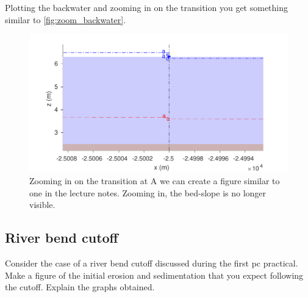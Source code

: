\documentclass[a4paper]{article}
\begin{document}
\begin{solution}
  Plotting the backwater and zooming in on the transition you get something similar to \autoref{fig:zoom_backwater}.
  \begin{figure}
      \centering
  \includegraphics[width=\linewidth]{matlab/zoom_backwater.pdf}
      \caption{Zooming in on the transition at A we can create a figure similar to one in the lecture notes. Zooming in, the bed-slope is no longer visible.}
      \label{fig:zoom_backwater}
  \end{figure}

\end{solution}
\subsection{River bend cutoff}
\begin{exercise}
  Consider the case of a river bend cutoff discussed during the first pc practical. Make a figure of the initial erosion and sedimentation that you expect following the cutoff. Explain the graphs obtained.
\end{exercise}
\end{document}
